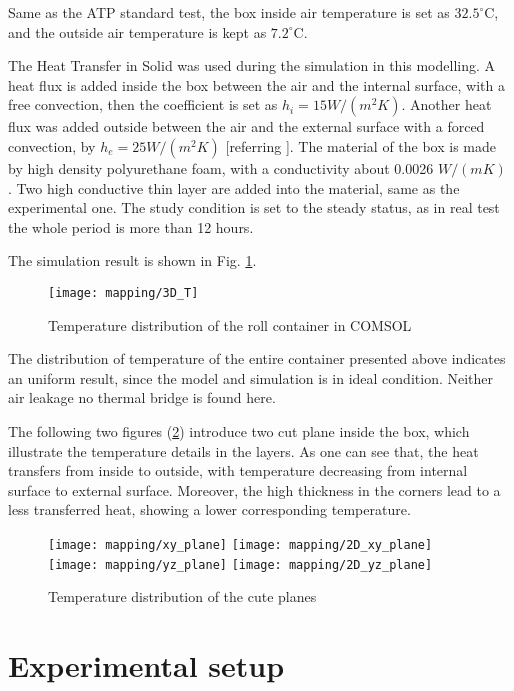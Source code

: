 Same as the ATP standard test, the box inside air temperature is set as $32.5^{\circ}$C, and the outside air temperature is kept as $7.2^{\circ}$C. 

The Heat Transfer in Solid was used during the simulation in this modelling. A heat flux is added inside the box between the air and the internal surface, with a free convection, then the coefficient is set as $h_i=15 W/(m^2 K)$. Another heat flux was added outside between the air and the external surface with a forced convection, by $h_e=25 W/(m^2 K)$ [referring \citep{airhe,htwiki}]. The material of the box is made by high density polyurethane foam, with a conductivity about 0.0026 $W/(mK)$ \citep{jarfelt2006thermal}. Two high conductive thin layer are added into the material, same as the experimental one. The study condition is set to the steady status, as in real test the whole period is more than 12 hours.

The simulation result is shown in Fig. \ref{3D_T}. 
\begin{figure}[!htbp]
	\centering
	\texttt{[image: mapping/3D\_T]}
	\caption{Temperature distribution of the roll container in COMSOL}
	\label{3D_T}
\end{figure}

The distribution of temperature of the entire container presented above indicates an uniform result, since the model and simulation is in ideal condition. Neither air leakage no thermal bridge is found here.

The following two figures (\ref{cut_plane}) introduce two cut plane inside the box, which illustrate the temperature details in the layers. As one can see that, the heat transfers from inside to outside, with temperature decreasing from internal surface to external surface. Moreover, the high thickness in the corners lead to a less transferred heat, showing a lower corresponding temperature.
\begin{figure} [htbp]
	\hspace{-20pt}
	\texttt{[image: mapping/xy\_plane]}
	\texttt{[image: mapping/2D\_xy\_plane]}
	\vspace{5pt}
	\hspace{-20pt}
	\texttt{[image: mapping/yz\_plane]}
	\texttt{[image: mapping/2D\_yz\_plane]}
	\caption{Temperature distribution of the cute planes}
	\label{cut_plane}
\end{figure}

\section{Experimental setup}
